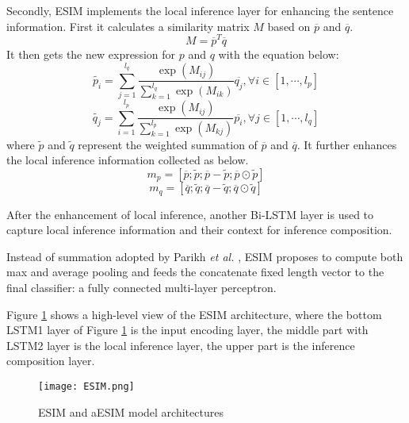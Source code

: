 \documentclass[10pt,sigconf]{acmart}
\begin{document}
Secondly, ESIM implements the local inference layer for enhancing the sentence information. First it calculates a similarity matrix $M$ based on $\overline{p}$ and $\overline{q}$.
\begin{equation}
M={{\overline{p}}^{T}}\overline{q}
\end{equation}
It then gets the new expression for $p$ and $q$ with the equation below:
\begin{equation}
\widetilde{{{p}_{i}}}=\sum\limits_{j=1}^{{{l}_{q}}}{\frac{\exp ({{M}_{ij}})}{\sum\limits_{k=1}^{{{l}_{q}}}{\exp ({{M}_{ik}})}}}\overline{{{q}_{j}}},\forall i\in [1,\cdots ,{{l}_{p}}]
\end{equation}
\begin{equation}
 \widetilde{{{q}_{j}}}=\sum\limits_{i=1}^{{{l}_{p}}}{\frac{\exp ({{M}_{ij}})}{\sum\nolimits_{k=1}^{{{l}_{p}}}{\exp ({{M}_{kj}})}}}\overline{{{p}_{i}}},\forall j\in [1,\cdots ,{{l}_{q}}]
\end{equation}
where $\widetilde{p}$ and  $\widetilde{q}$ represent the weighted summation of   $\overline{p}$ and $\overline{q}$. It further enhances the local inference information collected as below.
\begin{equation}
    {{m}_{p}}=[\overline{p};\widetilde{p};\overline{p}-\widetilde{p};\overline{p}\odot \widetilde{p}]
\end{equation}
\begin{equation}
    {{m}_{q}}=[\overline{q};\widetilde{q};\overline{q}-\widetilde{q};\overline{q}\odot \widetilde{q}]
\end{equation}

After the enhancement of local inference, another Bi-LSTM layer is used to capture local inference information and their context for inference composition.

Instead of summation adopted by Parikh {\it et al.} \cite{parikh2016decomposable}, ESIM proposes to compute both max and average pooling and feeds the concatenate fixed length vector to the final classifier: a fully connected multi-layer perceptron.

Figure \ref{fig:ESIM-figl} shows a high-level view of the ESIM architecture, where the bottom LSTM1 layer of Figure \ref{fig:ESIM-figl} is the input encoding layer, the middle part with LSTM2 layer is the local inference layer, the upper part is the inference composition layer.

\begin{figure}[h]
    \centering
    \texttt{[image: ESIM.png]}
    \caption{ESIM and aESIM model architectures}
    \label{fig:ESIM-figl}
\end{figure}
\end{document}
